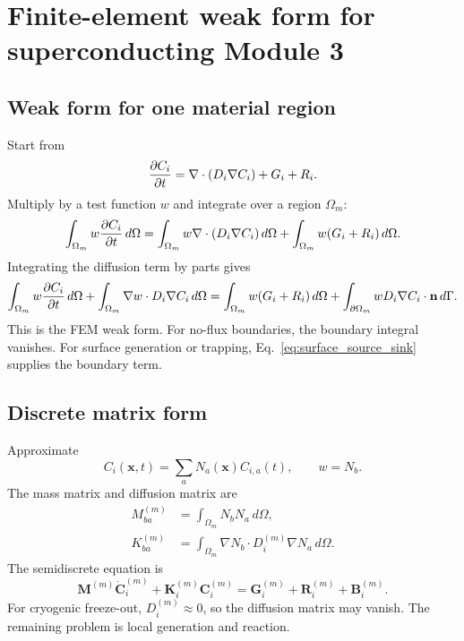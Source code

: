\documentclass[11pt]{article}
\newcommand{\nvecb}{\mathbf{n}}
\newcommand{\x}{\mathbf{x}}
\begin{document}
\section{Finite-element weak form for superconducting Module 3}

\subsection{Weak form for one material region}

Start from
\begin{equation}
\pdv{C_i}{t}=\nabla\cdot(D_i\nabla C_i)+G_i+R_i.
\end{equation}
Multiply by a test function $w$ and integrate over a region $\Omega_m$:
\begin{equation}
\int_{\Omega_m} w\pdv{C_i}{t}\,d\Omega
=\int_{\Omega_m} w\nabla\cdot(D_i\nabla C_i)\,d\Omega
+\int_{\Omega_m} w(G_i+R_i)\,d\Omega.
\end{equation}
Integrating the diffusion term by parts gives
\begin{equation}
\int_{\Omega_m} w\pdv{C_i}{t}\,d\Omega
+\int_{\Omega_m}\nabla w\cdot D_i\nabla C_i\,d\Omega
=\int_{\Omega_m} w(G_i+R_i)\,d\Omega
+\int_{\partial\Omega_m} w D_i\nabla C_i\cdot \nvecb\,d\Gamma.
\label{eq:weak_m3_sc}
\end{equation}
This is the FEM weak form. For no-flux boundaries, the boundary integral vanishes. For surface generation or trapping, Eq.~\eqref{eq:surface_source_sink} supplies the boundary term.

\subsection{Discrete matrix form}

Approximate
\begin{equation}
C_i(\x,t)=\sum_a N_a(\x) C_{i,a}(t),
\qquad
w=N_b.
\end{equation}
The mass matrix and diffusion matrix are
\begin{align}
M_{ba}^{(m)}&=\int_{\Omega_m} N_b N_a\,d\Omega,\\
K_{ba}^{(m)}&=\int_{\Omega_m} \nabla N_b\cdot D_i^{(m)}\nabla N_a\,d\Omega.
\end{align}
The semidiscrete equation is
\begin{equation}
\mathbf{M}^{(m)}\dot{\mathbf{C}}_i^{(m)}+
\mathbf{K}_i^{(m)}\mathbf{C}_i^{(m)}
=\mathbf{G}_i^{(m)}+\mathbf{R}_i^{(m)}+\mathbf{B}_i^{(m)}.
\label{eq:semi_discrete_m3_sc}
\end{equation}
For cryogenic freeze-out, $D_i^{(m)}\approx 0$, so the diffusion matrix may vanish. The remaining problem is local generation and reaction.
\end{document}

